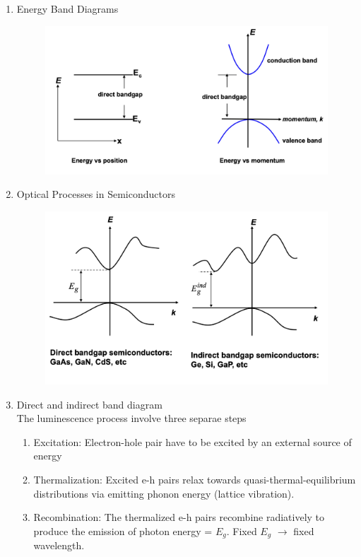 \documentclass{article}
\begin{document}
\begin{enumerate}
\begin{table}[h!]
\begin{tabular}{lc}
        \bottomrule
      \end{tabular}
    \end{table}
    \newpage
    \item Energy Band Diagrams \\
    \begin{figure}[h]
        \centering
        \includegraphics[width=0.75\linewidth]{image/bandgapdiagram.png}
    \end{figure}
    \item Optical Processes in Semiconductors
    \begin{figure}[h]
        \centering
        \includegraphics[width=0.75\linewidth]{image/opticalprocesssemincon.png}
    \end{figure}
    \item Direct and indirect band diagram\\
    The luminescence process involve three separae steps
    \begin{enumerate}
        \item Excitation: Electron-hole pair have to be excited by an external source of energy
        \item Thermalization: Excited e-h pairs relax towards quasi-thermal-equilibrium distributions via emitting phonon energy (lattice vibration).
        \item Recombination: The thermalized e-h pairs recombine radiatively to produce the emission of photon energy = $E_g$. Fixed $E_g$ $\rightarrow$ fixed wavelength.

\end{enumerate}
\end{enumerate}
\end{document}
